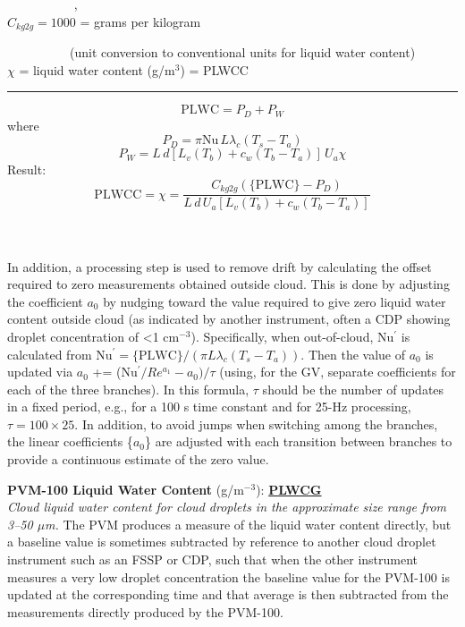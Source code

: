\begin{hangparagraphs}
{\begin{minipage}[t]{0.95\textwidth}
~~~~~~~~~~%
, \\
$C_{kg2g}=1000$
= grams per kilogram 

~~~~~~~~~~(unit conversion to conventional units for liquid
water content)\\
$\chi$ = liquid water
content (g/m$^{3}$) = PLWCC

\rule[0.5ex]{1\linewidth}{1pt}
\[
\mathrm{PLWC}=P_{D}+P_{W}
\]
where
\[
P_{D}=\pi\mathrm{Nu}\,L\lambda_{c}(T_{s}-T_{a})
\]
\[
P_{W}=L\,d[L_{v}(T_{b})+c_{w}(T_{b}-T_{a})]\,U_{a}\chi
\]
Result:
\[
\mathrm{PLWCC}=\chi=\frac{C_{kg2g}(\mathrm{\{PLWC\}}-P_{D})}{L\,d\,U_{a}[L_{v}(T_{b})+c_{w}(T_{b}-T_{a})]}
\]
%
\end{minipage}}\\
\\
In addition, a processing step is used to remove drift by calculating
the offset required to zero measurements obtained outside cloud. This
is done by adjusting the coefficient $a_{0}$ by nudging toward the
value required to give zero liquid water content outside cloud (as
indicated by another instrument, often a CDP showing droplet concentration
of <1 cm$^{-3}$). Specifically, when out-of-cloud, Nu$^{\prime}$
is calculated from Nu$^{\prime}=\mathrm{\{PLWC\}}/(\pi L\lambda_{c}(T_{s}-T_{a}))$.
Then the value of $a_{0}$ is updated via $a_{0}$ += (Nu$^{\prime}/Re^{a_{1}}-a_{0})/\tau$
(using, for the GV, separate coefficients for each of the three branches).
In this formula, $\tau$ should be the number of updates in a fixed
period, e.g., for a 100 s time constant and for 25-Hz processing,
$\tau=100\times25$. In addition, to avoid jumps when switching among
the branches, the linear coefficients \{$a_{0}$\} are adjusted with
each transition between branches to provide a continuous estimate
of the zero value.

\textbf{PVM-100 Liquid Water Content} (g/m$^{-3}$):\textbf{
}\textbf{\uline{PLWCG}}\textbf{}\\
\emph{Cloud liquid water content for cloud droplets in the approximate
size range from 3--50 $\mu$m. }The PVM produces a measure of the
liquid water content directly, but a baseline value is sometimes subtracted
by reference to another cloud droplet instrument such as an FSSP or
CDP, such that when the other instrument measures a very low droplet
concentration the baseline value for the PVM-100 is updated at the
corresponding time and that average is then subtracted from the measurements
directly produced by the PVM-100.\label{punch:5-1}


\end{hangparagraphs}
